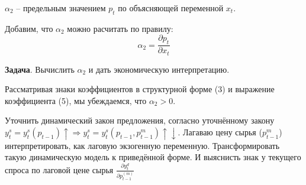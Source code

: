 \documentclass[12pt,a4paper]{article}
\begin{document}
$\alpha_2$ -- предельным значением $p_t$ по объясняющей переменной $x_t$. 

Добавим, что $\alpha_2$ можно расчитать по правилу:
\begin{equation}
\alpha_2 = \frac{\partial p_t}{\partial x_t}
\end{equation}

\textbf{Задача}. Вычислить $\alpha_2$ и дать экономическую интерпретацию. 

Рассматривая знаки коэффициентов в структурной форме (3) и выражение коэффициента (5), мы убеждаемся, что $\alpha_2 > 0$.

 Уточнить динамический закон предложения, согласно уточнённому закону
$y_t^s = y_t^s(p_{t-1})\uparrow  \Rightarrow y_t^s = y_t^s(p_{t-1}, p_{t-1}^m)\uparrow \downarrow$.
Лагаваю цену сырья ($p_{t-1}^m$) интерпретировать, как лаговую экзогенную переменную. Трансформировать такую динамическую модель к приведённой форме. И выяснисть знак у текущего спроса по лаговой цене сырья $\displaystyle{\frac{\partial y_t^d}{\partial p_{t-1}^{(m)}}}$
\end{document}

